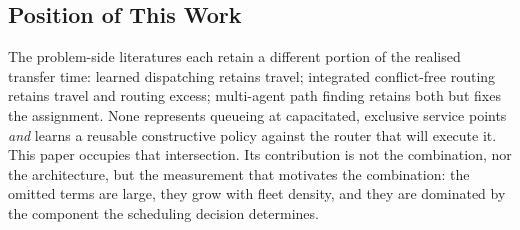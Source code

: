 \subsection{Position of This Work}

The problem-side literatures each retain a different portion of the realised
transfer time: learned dispatching retains travel; integrated conflict-free
routing retains travel and routing excess; multi-agent path finding retains
both but fixes the assignment. None represents queueing at capacitated,
exclusive service points \emph{and} learns a reusable constructive policy
against the router that will execute it. This paper occupies that
intersection. Its contribution is not the combination, nor the architecture,
but the measurement that motivates the combination: the omitted terms are
large, they grow with fleet density, and they are dominated by the component
the scheduling decision determines.
